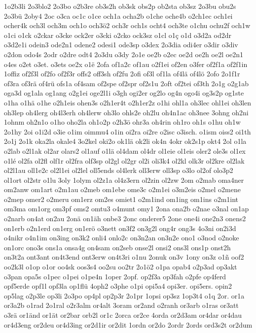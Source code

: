 {1o2b3li
2o3blo2
2o3bo
o2b3re
ob3s2h
ob3sk
obs2p
ob2sta
ob3sz
2o3bu
obu2s
2o3bü
2oby4
2oc
o3ca
oc1c
o1ce
och1a
ocha2b
o1che
oche4b
o2ch1ec
och1ei
ocher4k
och3l
och3m
och1o
och3ö2
och3r
och1s
ocht4
och3te
o1chu
ochu2f
och1w
o1ci
o1ck
o2ckar
o3cke
ock2er
o3cki
o2cko
ock3sz
o1cl
o1ç
o1d
o3d2a
od2dr
o3d2e1i
odein3
ode2n1
odene2
odesi1
ode3sp
o3dex
2o3dia
odi4er
o3dir
o3div
o2don
odo4s
2odr
o2dre
odt4
2o3du
o3dy
2o1e
oe2b
o2ec
oe2d
oe2h
oe2l
oe2n1
o4es
o2et
o3et.
o3ets
oe2x
o1ë
2ofa
of1a2c
of1au
o2f1ei
of2en
o3fer
of2f1a
of2f1in
1offiz
of2f3l
of2fo
of2f3r
offs2
off3sh
of2fu
2ofi
of3l
of1la
of4lä
of4lö
2ofo
2o1f1r
of3ra
of3rä
of4rü
ofs1a
of4sam
of2spe
of2spr
of2s1u
2oft
of2tei
of3th
2o1g
o2g1ab
oga3d
og1ala
og1ang
o2g1ei
oge2l1i
o3gh
ogi2er
og2lo
og4n
ogo4i
og3s2p
og1ste
o1ha
o1hä
o1he
o2h1eis
ohen3s
o2h1er4t
o2h1er2z
o1hi
ohl1a
oh3lec
ohl1ei
oh3len
oh3lep
oh4lerg
oh4l3erh
oh4lerw
oh3lo
ohls2e
oh2lu
oh4n1ac
oh3nee
3ohng
oh2ni
1ohnm
oh2n1o
o1ho
oho2la
oh1o2p
o2h3ö
ohr3a
oh4rin
oh1ro
oh1s
o1hu
oh1w
2o1hy
2oi
o1i2d
o3ie
o1im
oimmu4
o1in
oi2ra
oi2re
o2isc
o3isch.
o1ism
oiss2
oi1th
2o1j
2o1k
oka2la
okale4
3o2kel
oki2o
ok1lä
ok2li
ok4n
4okr
ok2s1p
okt4
2ol
o1la
o2lab
o2l1ak
ol2ar
olars2
ol1auf
o1lä
ol4dam
ol4dr
ol1eie
ol1eis
oler2
ole3s
ol1ex
o1lé
ol2fa
ol2fl
olf1r
ol2fra
olf3sp
ol2gl
ol2gr
ol2i
oli3k4
ol2kl
olk3r
ol2kre
ol2lak
ol2l1au
oll1e2c
ol2l1ei
ol2lel
oll5ends
ol4lerk
oll3erw
oll3sp
o3lo
ol2of
olo3p2
ol1ort
ol2str
o1lu
3oly
1olym
ol2z1a
ol4z3ern
ol2zin
ol2zw
2om
o2mab
oma4ner
om2anw
om1art
o2m1au
o2meb
om1ebe
ome3c
o2m1ei
o3m2eis
o2mel
o2mene
o2mep
omer2
o2meru
om1erz
om2es
omiet1
o2m1ind
om1ing
om1ins
o2m1int
om3ma
om1org
om3pf
oms2
omtu3
o4munt
omy1
2ona
ona2b
o2nae
o3nal
on1ap
o2narb
on4at
on2au
2onä
on1äh
onbe3
2onc
onderer5
2one
one4i
one2n3
onens2
on1erb
o2n1erd
on1erg
on1erö
o3nett
on3f2
on3g2l
ong4r
ong3s
4o3ni
on2i3d
o4nikr
o4n1im
on3ing
on3k2
onli4
onlo2c
on3n2an
on3n2e
ono1
o3nod
o2noke
on1orc
ono3s
ons1a
onsa4g
on4sam
on2seb
onse2l
onsi2
ons3l
ons1p
onst2h
on3t2a
ont3ant
on4t3end
ont3erw
on4t3ri
o1nu
2onuk
on3v
1ony
on3z
o1ñ
oof2
oo2k3l
o1op
o1or
oo4sk
oos3s4
oo2su
oo2tr
2o1ö2
o1pa
opab4
o2p3ad
op3akt
o3pan
opa5s
o1pec
o1pei
o1pe4n
1oper
2opf.
op2f3a
op3fah
o2pfe
op4ferd
opf5erde
opf1l
opf3la
op1flü
4oph2
o3phe
o1pi
opi5a4
opi3er.
opi5ers.
opin2
op5lag
o2p3le
op3li
2o3po
op4pl
op2p3r
2o1pr
1opsi
op3sz
1op3t4
o1q
2or.
or1a
or3a2b
o1rad
2o1ral
o2r3alm
or4alt
3oram
or2and
o2ranh
or3arb
o1ras
or3att
o3rä
or1änd
or1ät
or2bar
orb2l
or1c
2orca
or2ce
4orda
or2d3am
or4dar
or4dau
or4d3eng
or2deu
or4d3ing
or2d1ir
or2dit
1ordn
or2do
2ordr
2ords
ord3s2t
or2dum
}
